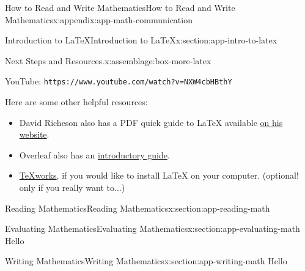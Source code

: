 \documentclass[oneside,10pt,]{book}
\newcommand{\mono}[1]{\texttt{#1}}
\numberwithin{equation}{section}
\newlength{\qrsize}
\newlength{\previewwidth}
\begin{document}
\begin{appendixptx}{How to Read and Write Mathematics}{}{How to Read and Write Mathematics}{}{}{x:appendix:app-math-communication}
\begin{sectionptx}{Introduction to \LaTeX{}}{}{Introduction to \LaTeX{}}{}{}{x:section:app-intro-to-latex}
\begin{assemblage}{Next Steps and Resources.}{x:assemblage:box-more-latex}
\begin{sidebyside}{1}{0}{0}{0}
\begin{sbspanel}{1}
\begin{tcbraster}[raster columns=2, raster column skip=1pt, raster halign=center, raster force size=false, raster left skip=0pt, raster right skip=0pt]
\begin{tcolorbox}[previewstyle, width=\previewwidth]
\end{tcolorbox}%
\begin{tcolorbox}[qrstyle]%
{\hypersetup{urlcolor=black}}%
\end{tcolorbox}%
\begin{tcolorbox}[captionstyle]%
\small YouTube: \mono{https://www.youtube.com/watch?v=NXW4cbHBthY}\end{tcolorbox}%
\end{tcbraster}%
\end{sbspanel}%
\end{sidebyside}%
\par
Here are some other helpful resources:%
\begin{itemize}[label=\textbullet]
\item{}David Richeson also has a PDF quick guide to \LaTeX{} available \href{https://divisbyzero.com/teaching/a-quick-guide-to-latex/}{on his website}.%
\item{}Overleaf also has an \href{https://www.overleaf.com/learn/latex/Learn_LaTeX_in_30_minutes}{introductory guide}.%
\item{}\href{http://www.tug.org/texworks/}{TeXworks}, if you would like to install \LaTeX{} on your computer. (optional! only if you really want to...)%
\end{itemize}
%
\end{assemblage}
\end{sectionptx}
%
%
\typeout{************************************************}
\typeout{************************************************}
%
\begin{sectionptx}{Reading Mathematics}{}{Reading Mathematics}{}{}{x:section:app-reading-math}
\end{sectionptx}
%
%
\typeout{************************************************}
\typeout{************************************************}
%
\begin{sectionptx}{Evaluating Mathematics}{}{Evaluating Mathematics}{}{}{x:section:app-evaluating-math}
Hello%
\end{sectionptx}
%
%
\typeout{************************************************}
\typeout{************************************************}
%
\begin{sectionptx}{Writing Mathematics}{}{Writing Mathematics}{}{}{x:section:app-writing-math}
Hello%
\end{sectionptx}
\end{appendixptx}
\end{document}
